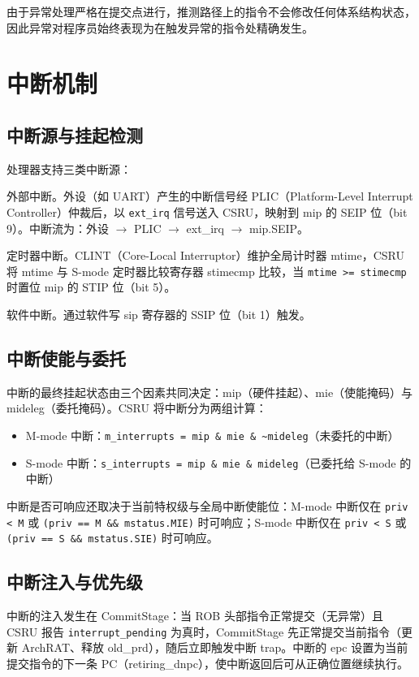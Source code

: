由于异常处理严格在提交点进行，推测路径上的指令不会修改任何体系结构状态，因此异常对程序员始终表现为在触发异常的指令处精确发生。

\section{中断机制}

\subsection{中断源与挂起检测}

处理器支持三类中断源：

外部中断。外设（如 UART）产生的中断信号经 PLIC（Platform-Level Interrupt Controller）仲裁后，以 \lstinline|ext_irq| 信号送入 CSRU，映射到 mip 的 SEIP 位（bit 9）。中断流为：外设 $\to$ PLIC $\to$ ext\_irq $\to$ mip.SEIP。

定时器中断。CLINT（Core-Local Interruptor）维护全局计时器 mtime，CSRU 将 mtime 与 S-mode 定时器比较寄存器 stimecmp 比较，当 \lstinline|mtime >= stimecmp| 时置位 mip 的 STIP 位（bit 5）。

软件中断。通过软件写 sip 寄存器的 SSIP 位（bit 1）触发。

\subsection{中断使能与委托}

中断的最终挂起状态由三个因素共同决定：mip（硬件挂起）、mie（使能掩码）与 mideleg（委托掩码）。CSRU 将中断分为两组计算：

\begin{itemize}
  \item M-mode 中断：\lstinline|m_interrupts = mip & mie & ~mideleg|（未委托的中断）
  \item S-mode 中断：\lstinline|s_interrupts = mip & mie & mideleg|（已委托给 S-mode 的中断）
\end{itemize}

中断是否可响应还取决于当前特权级与全局中断使能位：M-mode 中断仅在 \lstinline|priv < M| 或 \lstinline|(priv == M && mstatus.MIE)| 时可响应；S-mode 中断仅在 \lstinline|priv < S| 或 \lstinline|(priv == S && mstatus.SIE)| 时可响应。

\subsection{中断注入与优先级}

中断的注入发生在 CommitStage：当 ROB 头部指令正常提交（无异常）且 CSRU 报告 \lstinline|interrupt_pending| 为真时，CommitStage 先正常提交当前指令（更新 ArchRAT、释放 old\_prd），随后立即触发中断 trap。中断的 epc 设置为当前提交指令的下一条 PC（retiring\_dnpc），使中断返回后可从正确位置继续执行。


